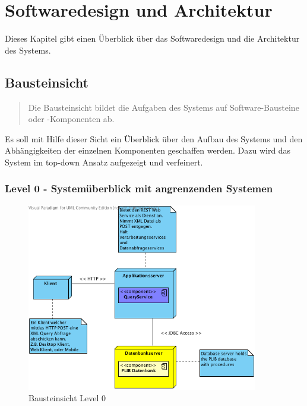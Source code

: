 \section{Softwaredesign und Architektur}

Dieses Kapitel gibt einen Überblick über das Softwaredesign und die Architektur des Systems. 

\subsection{Bausteinsicht}
\begin{quotation}
Die Bausteinsicht bildet die Aufgaben des Systems auf Software-Bausteine oder -Komponenten ab.
 \citep[S. 98ff][]{starke}	
\end{quotation}

Es soll mit Hilfe dieser Sicht ein Überblick über den Aufbau des Systems und den Abhängigkeiten der einzelnen Komponenten geschaffen werden. Dazu wird das System im top-down Ansatz aufgezeigt und verfeinert. 

\subsubsection{Level 0 - Systemüberblick mit angrenzenden Systemen} 

\begin{figure}[htbp]
	\centering
		\includegraphics[width=0.9\textwidth]{images/bausteinsicht_plib_level0.png}
	\caption{Bausteinsicht Level 0}
	\label{fig:bausteinsicht_level0}
\end{figure}

